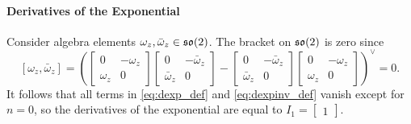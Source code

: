 \paragraph{Derivatives of the Exponential}

Consider algebra elements $\omega_z, \bar \omega_z \in {\mathfrak{so}(2)}$. The bracket on ${\mathfrak{so}(2)}$ is zero since
\begin{equation}
  \left[ \omega_z, \bar \omega_z \right] = \left( \begin{bmatrix}
      0 & -\omega_z \\ \omega_z & 0
    \end{bmatrix}\begin{bmatrix}
      0 & -\bar \omega_z \\ \bar \omega_z & 0
    \end{bmatrix} - \begin{bmatrix}
      0 & -\bar \omega_z \\ \bar \omega_z & 0
    \end{bmatrix}\begin{bmatrix}
      0 & - \omega_z \\ \omega_z & 0
    \end{bmatrix}\right)^\vee = 0.
\end{equation}
It follows that all terms in \eqref{eq:dexp_def} and \eqref{eq:dexpinv_def} vanish except for $n = 0$, so the derivatives of the exponential are equal to $I_{1} = \begin{bmatrix} 1 \end{bmatrix}$.

